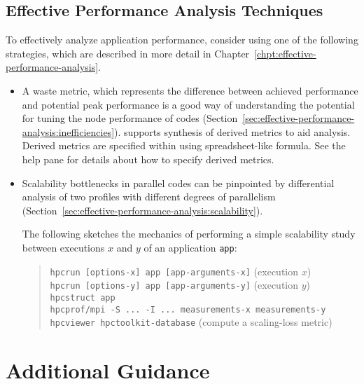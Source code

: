 \documentclass[11pt,letterpaper]{report}
\begin{document}
\subsection{Effective Performance Analysis Techniques}

To effectively analyze application performance, consider using one of the following strategies, which are described in more detail in Chapter~\ref{chpt:effective-performance-analysis}.
\begin{itemize}
\item
A waste metric, which represents the difference between achieved performance and potential peak performance is a good way of understanding the potential for tuning the node performance of codes (Section~\ref{sec:effective-performance-analysis:inefficiencies}).
\hpcviewer{} supports synthesis of derived metrics to aid analysis.
Derived metrics are specified within \hpcviewer{} using spreadsheet-like formula.
See the \hpcviewer{} help pane for details about how to specify derived metrics.

\item
Scalability bottlenecks in parallel codes can be pinpointed by differential analysis of two profiles with different degrees of parallelism (Section~\ref{sec:effective-performance-analysis:scalability}).

The following sketches the mechanics of performing a simple scalability study between executions $x$ and $y$ of an application \texttt{app}:
\begin{quote}
  \verb|hpcrun [options-x] app [app-arguments-x]| \hfill (execution $x$) \\
  \verb|hpcrun [options-y] app [app-arguments-y]| \hfill (execution $y$) \\
  \verb|hpcstruct app| \\
  \verb|hpcprof/mpi -S ... -I ... measurements-x measurements-y| \\
  \verb|hpcviewer hpctoolkit-database| \hfill (compute a scaling-loss metric)
\end{quote}

\end{itemize}



\section{Additional Guidance}
\end{document}
